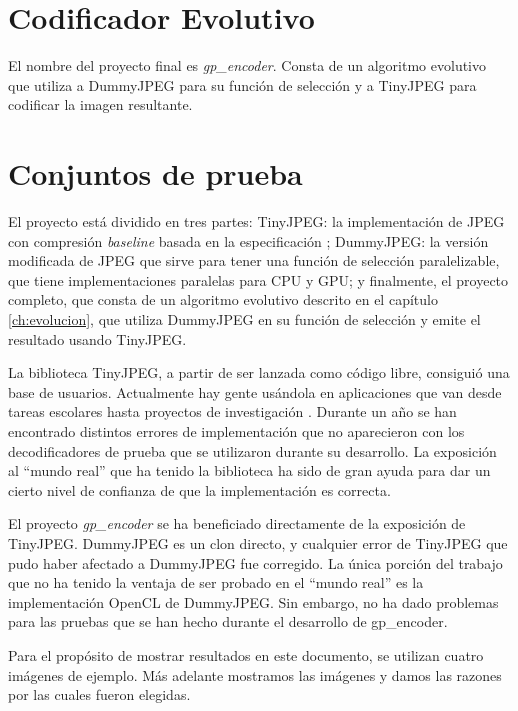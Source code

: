 \section{Codificador Evolutivo}

El nombre del proyecto final es \emph{gp\_encoder}. Consta de un algoritmo
evolutivo que utiliza a DummyJPEG para su función de selección y a TinyJPEG
para codificar la imagen resultante.

\section{Conjuntos de prueba} \label{sec:testset}

El proyecto está dividido en tres partes: TinyJPEG: la implementación de JPEG
con compresión \emph{baseline} basada en la especificación \cite{jpeg-spec};
DummyJPEG: la versión modificada de JPEG que sirve para tener una función de
selección paralelizable, que tiene implementaciones paralelas para CPU y GPU; y
finalmente, el proyecto completo, que consta de un algoritmo evolutivo descrito
en el capítulo \ref{ch:evolucion}, que utiliza DummyJPEG en su función de selección y emite
el resultado usando TinyJPEG.

La biblioteca TinyJPEG, a partir de ser lanzada como código libre, consiguió
una base de usuarios. Actualmente hay gente usándola en aplicaciones que van
desde tareas escolares hasta proyectos de investigación \cite{humblebrag}.
Durante un año se han encontrado distintos errores de implementación que no
aparecieron con los decodificadores de prueba que se utilizaron durante su
desarrollo. La exposición al ``mundo real'' que ha tenido la biblioteca ha sido
de gran ayuda para dar un cierto nivel de confianza de que la implementación es
correcta.

El proyecto \emph{gp\_encoder} se ha beneficiado directamente de la exposición
de TinyJPEG. DummyJPEG es un clon directo, y cualquier error de TinyJPEG que
pudo haber afectado a DummyJPEG fue corregido. La única porción del trabajo que
no ha tenido la ventaja de ser probado en el ``mundo real'' es la implementación
OpenCL de DummyJPEG. Sin embargo, no ha dado problemas para las pruebas que se
han hecho durante el desarrollo de gp\_encoder.

Para el propósito de mostrar resultados en este documento, se utilizan cuatro
imágenes de ejemplo. Más adelante mostramos las imágenes y damos las razones
por las cuales fueron elegidas.

